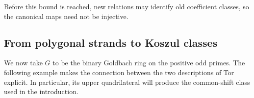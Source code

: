 Before this bound is reached, new relations may identify old coefficient
classes, so the canonical maps need not be injective.

\subsection{From polygonal strands to Koszul classes}
We now take $G$ to be the binary Goldbach ring on the positive odd
primes. The following example makes the connection between the two
descriptions of Tor explicit. In particular, its upper quadrilateral
will produce the common-shift class used in the introduction.




